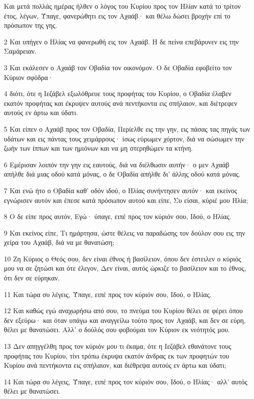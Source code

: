 \par Και μετά πολλάς ημέρας ήλθεν ο λόγος του Κυρίου προς τον Ηλίαν κατά το τρίτον έτος, λέγων, Ύπαγε, φανερώθητι εις τον Αχαάβ· και θέλω δώσει βροχήν επί το πρόσωπον της γης.
\par 2 Και υπήγεν ο Ηλίας να φανερωθή εις τον Αχαάβ. Η δε πείνα επεβάρυνεν εις την Σαμάρειαν.
\par 3 Και εκάλεσεν ο Αχαάβ τον Οβαδία τον οικονόμον. Ο δε Οβαδία εφοβείτο τον Κύριον σφόδρα·
\par 4 διότι, ότε η Ιεζάβελ εξωλόθρευε τους προφήτας του Κυρίου, ο Οβαδία έλαβεν εκατόν προφήτας και έκρυψεν αυτούς ανά πεντήκοντα εις σπήλαιον, και διέτρεφεν αυτούς εν άρτω και ύδατι.
\par 5 Και είπεν ο Αχαάβ προς τον Οβαδία, Περίελθε εις την γην, εις πάσας τας πηγάς των υδάτων και εις πάντας τους χειμάρρους· ίσως εύρωμεν χόρτον, διά να σώσωμεν την ζωήν των ίππων και των ημιόνων και να μη στερηθώμεν τα κτήνη.
\par 6 Εμέρισαν λοιπόν την γην εις εαυτούς, διά να διέλθωσιν αυτήν· ο μεν Αχαάβ απήλθε διά μιας οδού κατά μόνας, ο δε Οβαδία απήλθε δι' άλλης οδού κατά μόνας.
\par 7 Και ενώ ήτο ο Οβαδία καθ' οδόν ιδού, ο Ηλίας συνήντησεν αυτόν· και εκείνος εγνώρισεν αυτόν και έπεσε κατά πρόσωπον αυτού και είπε, Συ είσαι, κύριέ μου Ηλία;
\par 8 Ο δε είπε προς αυτόν, Εγώ· ύπαγε, ειπέ προς τον κύριόν σου, Ιδού, ο Ηλίας.
\par 9 Και εκείνος είπε, Τι ημάρτησα, ώστε θέλεις να παραδώσης τον δούλον σου εις την χείρα του Αχαάβ, διά να με θανατώση;
\par 10 Ζη Κύριος ο Θεός σου, δεν είναι έθνος ή βασίλειον, όπου δεν έστειλεν ο κύριός μου να σε ζητώσι και ότε έλεγον, Δεν είναι, αυτός ώρκιζε το βασίλειον και το έθνος, ότι δεν σε εύρηκαν.
\par 11 Και τώρα συ λέγεις, Ύπαγε, ειπέ προς τον κύριόν σου, Ιδού, ο Ηλίας.
\par 12 Και καθώς εγώ αναχωρήσω από σου, το πνεύμα του Κυρίου θέλει σε φέρει όπου δεν εξεύρω· και όταν υπάγω και αναγγείλω τούτο προς τον Αχαάβ, και δεν σε εύρη, θέλει με θανατώσει. Αλλ' ο δούλός σου φοβούμαι τον Κύριον εκ νεότητός μου.
\par 13 Δεν απηγγέλθη προς τον κύριόν μου τι έκαμα, ότε η Ιεζάβελ εθανάτονε τους προφήτας του Κυρίου, τίνι τρόπω έκρυψα εκατόν άνδρας εκ των προφητών του Κυρίου ανά πεντήκοντα εις σπήλαιον, και διέθρεψα αυτούς εν άρτω και ύδατι;
\par 14 Και τώρα συ λέγεις, Ύπαγε, ειπέ προς τον κύριόν σου, Ιδού, ο Ηλίας· αλλ' αυτός θέλει με θανατώσει.
